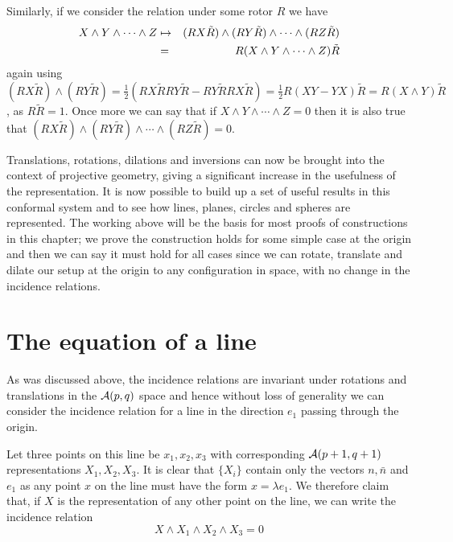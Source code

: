 Similarly, if we consider the relation under some rotor $R$ we have
%
\begin{eqnarray}
   X \wedge Y \wedge \cdots  \wedge Z & \mapsto & (RX\tilde{R}) \wedge (RY\tilde{R}) \wedge \cdots
\wedge (RZ\tilde{R}) \nonumber \\
   & = & R( X \wedge Y \wedge \cdots  \wedge Z)\tilde{R} \nonumber
\end{eqnarray}
%
again using $(RX\tilde{R})\wedge (RY\tilde{R}) =
\frac{1}{2}(RX\tilde{R} RY\tilde{R} - RY\tilde{R} RX\tilde{R}) =
\frac{1}{2}R(XY-YX)\tilde{R} = R(X\wedge Y)\tilde{R}$, as
$R\tilde{R}=1$. Once more we can say that if $X\wedge Y\wedge \cdots \wedge Z=0$ then 
it is also true that  $(RX\tilde{R})\wedge (RY\tilde{R})\wedge \cdots \wedge (RZ\tilde{R})=0$.

Translations, rotations, dilations and inversions
can now be brought into the context of projective geometry, giving a
significant increase in the usefulness of the representation. It is now
possible to build up a set of useful results in this conformal system and to
see how lines, planes, circles and spheres are represented. The working above
will be
the basis for most proofs of constructions in this chapter; we prove the
construction holds for some simple case at the origin and then we can say it
must  hold for all cases since we can rotate, translate and dilate our setup at
the origin to any configuration in space, with no change in the incidence
relations.

\section{The equation of a line}

As was discussed above, the incidence relations are invariant under rotations
and translations in the ${\mathcal{A}}(p,q)$ space and hence without loss of
generality we can consider the incidence relation for a line in the direction
$e_1$ passing through the origin.

Let three points on this line be $x_1,x_2,x_3$ with corresponding
${\mathcal{A}}(p+1,q+1)$ representations $X_1,X_2,X_3$. It is clear that $\{X_i\}$
contain only the vectors $n,\bar{n}$ and $e_1$ as any point $x$ on the line
must have the form $x = \lambda e_1$.  We therefore claim that, if $X$ is the
representation of any other point on the line, we can write the incidence 
relation
%
\[ X\wedge X_1 \wedge X_2 \wedge X_3 = 0  \]
%

